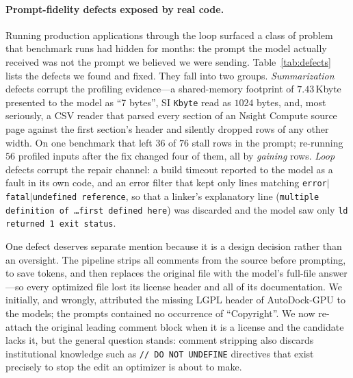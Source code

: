 \paragraph{Prompt-fidelity defects exposed by real code.}
Running production applications through the loop surfaced a class of problem that benchmark runs had
hidden for months: the prompt the model actually received was not the prompt we believed we were
sending. Table~\ref{tab:defects} lists the defects we found and fixed. They fall into two groups.
\emph{Summarization} defects corrupt the profiling evidence---a shared-memory footprint of
$7.43$\,Kbyte presented to the model as ``7 bytes'', SI \texttt{Kbyte} read as $1024$ bytes, and, most
seriously, a CSV reader that parsed every section of an Nsight Compute source page against the first
section's header and silently dropped rows of any other width. On one benchmark that left $36$ of $76$
stall rows in the prompt; re-running $56$ profiled inputs after the fix changed four of them, all by
\emph{gaining} rows. \emph{Loop} defects corrupt the repair channel: a build timeout reported to the
model as a fault in its own code, and an error filter that kept only lines matching
\texttt{error}$|$\texttt{fatal}$|$\texttt{undefined reference}, so that a linker's explanatory line
(\texttt{multiple definition of \ldots first defined here}) was discarded and the model saw only
\texttt{ld returned 1 exit status}.

One defect deserves separate mention because it is a design decision rather than an oversight. The
pipeline strips all comments from the source before prompting, to save tokens, and then replaces the
original file with the model's full-file answer---so every optimized file lost its license header and
all of its documentation. We initially, and wrongly, attributed the missing LGPL header of AutoDock-GPU
to the models; the prompts contained no occurrence of ``Copyright''. We now re-attach the original
leading comment block when it is a license and the candidate lacks it, but the general question stands:
comment stripping also discards institutional knowledge such as \texttt{// DO NOT UNDEFINE} directives
that exist precisely to stop the edit an optimizer is about to make.

